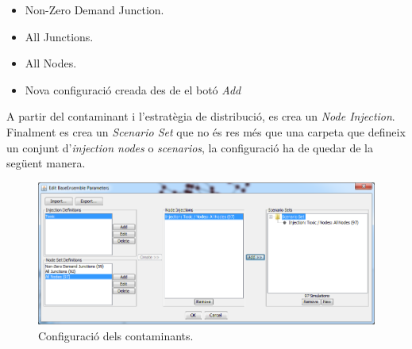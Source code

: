 \documentclass[12pt]{article}
\begin{document}
\begin{itemize}
	\item Non-Zero Demand Junction.
	\item All Junctions.
	\item All Nodes.
	\item Nova configuració creada des de el botó \textit{Add}
\end{itemize}
A partir del contaminant i l'estratègia de distribució, es crea un \textit{Node Injection}. Finalment es crea un \textit{Scenario Set} que no és res més que una carpeta que defineix un conjunt d'\textit{injection nodes} o \textit{scenarios}, la configuració ha de quedar de la següent manera.
\begin{figure}[h!]
	\centering
	\includegraphics[scale=.4]{imatges/teva-spot/6.png}
	\caption{Configuració dels contaminants.}
\end{figure}
\end{document}
